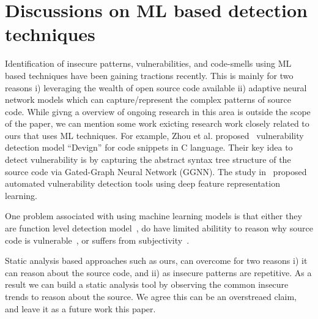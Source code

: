 
\section{Discussions on ML based detection techniques}
\label{sec:discussion}
Identification of insecure patterns, vulnerabilities, and code-smells using ML based 
techniques have been gaining tractions recently. This is mainly for two reasons 
i) leveraging the wealth of open source code available ii) adaptive neural network models 
which can capture/represent the complex patterns of source code. While givng a overview of ongoing  research in this area is outside
the scope of the paper, we can mention some work exicting research work closely related to ours that uses ML techniques. 
For example, Zhou et al. proposed~\cite{devign_neurips19} vulnerability detection model ``Devign'' for code snippets in C language. Their key idea to detect vulnerability is by capturing the abstract syntax tree structure of the source code via Gated-Graph Neural Network (GGNN).
The study in~\cite{Automated-Vulnerability-Detection-in-Source-Code-Using-Deep-Representation-Learning} proposed automated vulnerability detection tools using deep feature representation learning. 

One problem associated with using machine learning models is that either they are function level detection model~\cite{Automated-Vulnerability-Detection-in-Source-Code-Using-Deep-Representation-Learning}, do have limited abilitity 
to reason why source code is vulnerable~\cite{devign_neurips19}, or suffers from subjectivity~\cite{are-we-there-yet}.


Static analysis based approaches such as ours, can overcome for two reasons i) it can reason about the source code, and ii) as insecure patterns are repetitive. As a result we can build a static analysis tool by observing 
the common insecure trends to reason about the  source. 
We agree this can be an overstreaed claim, and leave it as a future work this paper.  


